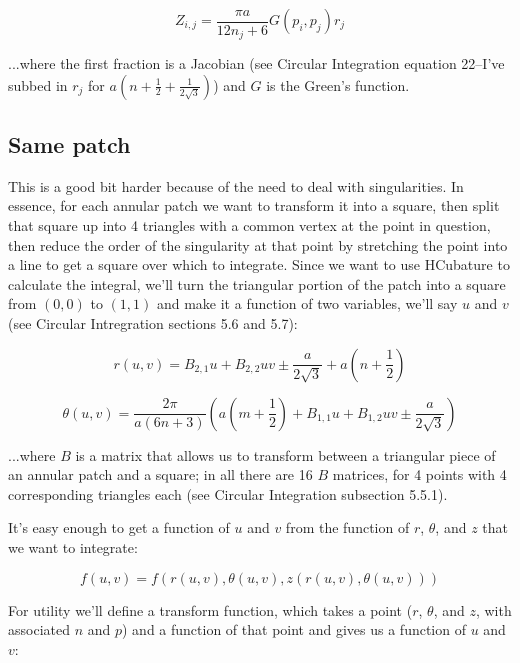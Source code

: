 \documentclass[etd,twoside,senior]{BYUPhys}
\begin{document}
\begin{equation}
  Z_{i,j}=\frac{\pi a}{12n_{j}+6}G\left(p_{i},p_{j}\right)r_{j}
\end{equation}

...where the first fraction is a Jacobian (see Circular Integration equation 22--I've subbed in $r_{j}$ for $a\left(n+\frac{1}{2}+\frac{1}{2\sqrt{3}}\right)$) and $G$ is the Green's function.

\subsection{Same patch} \label{sec:same_patch}
This is a good bit harder because of the need to deal with singularities. In essence, for each annular patch we want to transform it into a square, then split that square up into 4 triangles with a common vertex at the point in question, then reduce the order of the singularity at that point by stretching the point into a line to get a square over which to integrate. Since we want to use HCubature to calculate the integral, we'll turn the triangular portion of the patch into a square from $(0,0)$ to $(1,1)$ and make it a function of two variables, we'll say $u$ and $v$ (see Circular Intregration sections 5.6 and 5.7):

\begin{equation}
  r\left(u,v\right)=B_{2,1}u+B_{2,2}uv\pm\frac{a}{2\sqrt{3}}+a\left(n+\frac{1}{2}\right)
\end{equation}

\begin{equation}
  \theta\left(u,v\right)=\frac{2\pi}{a(6n+3)}\left(a\left(m+\frac{1}{2}\right)+B_{1,1}u+B_{1,2}uv\pm\frac{a}{2\sqrt{3}}\right)
\end{equation}

...where $B$ is a matrix that allows us to transform between a triangular
piece of an annular patch and a square; in all there are 16 $B$ matrices,
for 4 points with 4 corresponding triangles each (see Circular Integration
subsection 5.5.1).

It's easy enough to get a function of $u$ and $v$ from the function
of $r$, $\theta$, and $z$ that we want to integrate:

\begin{equation}
  f\left(u,v\right)=f\left(r\left(u,v\right),\theta\left(u,v\right),z\left(r\left(u,v\right),\theta\left(u,v\right)\right)\right)
\end{equation}

For utility we'll define a transform function, which takes a point
($r$, $\theta$, and $z$, with associated $n$ and $p$) and a function
of that point and gives us a function of $u$ and $v$:
\end{document}
